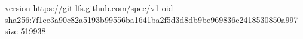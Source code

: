version https://git-lfs.github.com/spec/v1
oid sha256:7f1ee3a90c82a5193b99556ba1641ba2f5d3d8db9be969836e2418530850a997
size 519938
